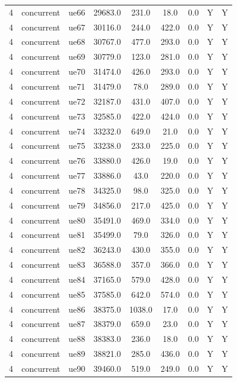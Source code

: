 \begin{table}[ht]
\begin{tabular}{|c|c|c|c|c|c|c|c|c|}
4 & concurrent & ue66 & 29683.0 & 231.0 & 18.0 & 0.0 & Y & Y \\
4 & concurrent & ue67 & 30116.0 & 244.0 & 422.0 & 0.0 & Y & Y \\
4 & concurrent & ue68 & 30767.0 & 477.0 & 293.0 & 0.0 & Y & Y \\
4 & concurrent & ue69 & 30779.0 & 123.0 & 281.0 & 0.0 & Y & Y \\
4 & concurrent & ue70 & 31474.0 & 426.0 & 293.0 & 0.0 & Y & Y \\
4 & concurrent & ue71 & 31479.0 & 78.0 & 289.0 & 0.0 & Y & Y \\
4 & concurrent & ue72 & 32187.0 & 431.0 & 407.0 & 0.0 & Y & Y \\
4 & concurrent & ue73 & 32585.0 & 422.0 & 424.0 & 0.0 & Y & Y \\
4 & concurrent & ue74 & 33232.0 & 649.0 & 21.0 & 0.0 & Y & Y \\
4 & concurrent & ue75 & 33238.0 & 233.0 & 225.0 & 0.0 & Y & Y \\
4 & concurrent & ue76 & 33880.0 & 426.0 & 19.0 & 0.0 & Y & Y \\
4 & concurrent & ue77 & 33886.0 & 43.0 & 220.0 & 0.0 & Y & Y \\
4 & concurrent & ue78 & 34325.0 & 98.0 & 325.0 & 0.0 & Y & Y \\
4 & concurrent & ue79 & 34856.0 & 217.0 & 425.0 & 0.0 & Y & Y \\
4 & concurrent & ue80 & 35491.0 & 469.0 & 334.0 & 0.0 & Y & Y \\
4 & concurrent & ue81 & 35499.0 & 79.0 & 326.0 & 0.0 & Y & Y \\
4 & concurrent & ue82 & 36243.0 & 430.0 & 355.0 & 0.0 & Y & Y \\
4 & concurrent & ue83 & 36588.0 & 357.0 & 366.0 & 0.0 & Y & Y \\
4 & concurrent & ue84 & 37165.0 & 579.0 & 428.0 & 0.0 & Y & Y \\
4 & concurrent & ue85 & 37585.0 & 642.0 & 574.0 & 0.0 & Y & Y \\
4 & concurrent & ue86 & 38375.0 & 1038.0 & 17.0 & 0.0 & Y & Y \\
4 & concurrent & ue87 & 38379.0 & 659.0 & 23.0 & 0.0 & Y & Y \\
4 & concurrent & ue88 & 38383.0 & 236.0 & 18.0 & 0.0 & Y & Y \\
4 & concurrent & ue89 & 38821.0 & 285.0 & 436.0 & 0.0 & Y & Y \\
4 & concurrent & ue90 & 39460.0 & 519.0 & 249.0 & 0.0 & Y & Y \\

\end{tabular}
\end{table}
